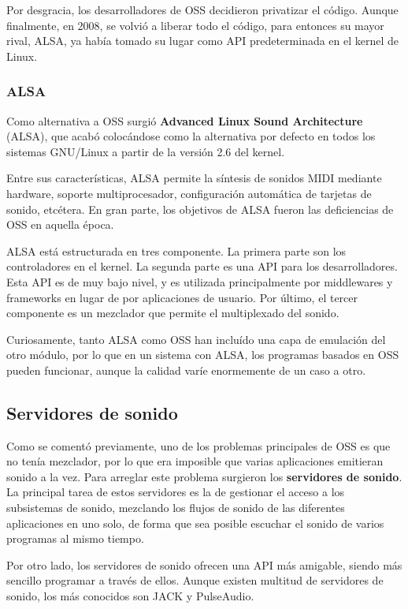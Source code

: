 Por desgracia, los desarrolladores de OSS decidieron privatizar el
código. Aunque finalmente, en 2008, se volvió a liberar todo el código, para
entonces su mayor rival, ALSA, ya había tomado su lugar como API predeterminada
en el kernel de Linux.

\subsubsection{ALSA}
Como alternativa a OSS surgió \textbf{Advanced Linux Sound Architecture} (ALSA),
que acabó colocándose como la alternativa por defecto en todos los sistemas
GNU/Linux a partir de la versión 2.6 del kernel.

Entre sus características, ALSA permite la síntesis de sonidos MIDI mediante
hardware, soporte multiprocesador, configuración automática de tarjetas de
sonido, etcétera. En gran parte, los objetivos de ALSA fueron las deficiencias
de OSS en aquella época.

ALSA está estructurada en tres componente. La primera parte son los
controladores en el kernel. La segunda parte es una API para los
desarrolladores. Esta API es de muy bajo nivel, y es utilizada principalmente
por middlewares y frameworks en lugar de por aplicaciones de usuario. Por
último, el tercer componente es un mezclador que permite el multiplexado del
sonido.

Curiosamente, tanto ALSA como OSS han incluído una capa de emulación del otro
módulo, por lo que en un sistema con ALSA, los programas basados en OSS pueden
funcionar, aunque la calidad varíe enormemente de un caso a otro.

\subsection{Servidores de sonido}

Como se comentó previamente, uno de los problemas principales de OSS es que no
tenía mezclador, por lo que era imposible que varias aplicaciones emitieran
sonido a la vez. Para arreglar este problema surgieron los \textbf{servidores de
  sonido}. La principal tarea de estos servidores es la de gestionar el acceso a
los subsistemas de sonido, mezclando los flujos de sonido de las diferentes
aplicaciones en uno solo, de forma que sea posible escuchar el sonido de varios
programas al mismo tiempo.

Por otro lado, los servidores de sonido ofrecen una API más amigable, siendo más
sencillo programar a través de ellos. Aunque existen multitud de servidores de
sonido, los más conocidos son JACK y PulseAudio.

